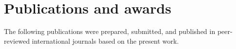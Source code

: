 
\chapter*{Publications and awards}

The following publications were prepared, submitted, and published in peer-reviewed international journals based on the present work.

